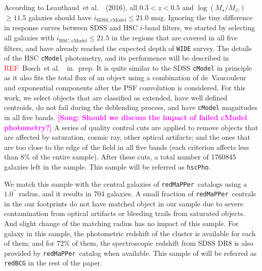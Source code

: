 \documentclass[preprint]{aastex}
\def\arcsec{{\prime\prime}}
\def\etal{{\ et al.~}}
\def\redm{\texttt{redMaPPer}}
\def\logms{{$\log (M_{\star}/M_{\odot})$}~}
\newcommand{\addref}{{\textcolor{red}{REF}}}
\newcommand{\song}[1]{\textcolor{magenta}{\textbf{[Song: #1]}}}
\begin{document}
\begin{CJK*}{UTF8}{gbsn}
    According to Leauthaud\etal~(2016), all $0.3 < z < 0.5$ and \logms$\geq 11.5$ galaxies
    should have $i_{\mathrm{SDSS, cModel}} \leq 21.0$ mag.  Ignoring the tiny difference
    in response curves between SDSS and HSC $i$-band filters, we started by selecting all
    galaxies with $i_{\mathrm{HSC, cModel}} \leq 21.5$ in the regions that are covered in
    all five filters, and have already reached the expected depth of \texttt{WIDE} survey.  
    The details of the HSC \texttt{cModel} photometry, and its performence will be
    described in \addref~Bosch\etal~in.\ prep. 
    It is quite similar to the SDSS \texttt{cModel} in principle as it also fits the total
    flux of an object using a combination of de~Vaucouleur and exponential components
    after the PSF convolution is considered.  
    For this work, we select objects that are classified as extended, have well defined 
    centroids, do not fail during the deblending process, and have \texttt{cModel} 
    magnitudes in all five bands. 
    \song{Should we discuss the impact of failed cModel photometry?} 
    A series of quality control cuts are applied to remove objects that are affected by 
    saturation, cosmic ray, other optical artifacts; and the ones that are too close to 
    the edge of the field in all five bands 
    (each criterion affects less than 8\% of the entire sample).
    After these cuts, a total number of 1760845 galaxies left in the sample.
    This sample will be referred as \texttt{hscPho}. 
    
    We match this sample with the central galaxies of \redm~catalogs using a 
    $1.0^{\arcsec}$ radius, and it results in 704 galaxies.  
    A small fraction of \redm~centrals in the our footprints do not have matched object in
    our sample due to severe contamination from optical artifacts or bleeding trails from
    saturated objects.  
    And slight change of the matching radius has no impact of this sample.  
    For galaxy in this sample, the photometric redshift of the cluster is available for
    each of them; and for 72\% of them, the spectroscopic redshift from SDSS DR8 is also
    provided by \redm~catalog when available. 
    This sample of will be referred as \texttt{redBCG} in the rest of the paper.
    

\end{CJK*}
\end{document}
